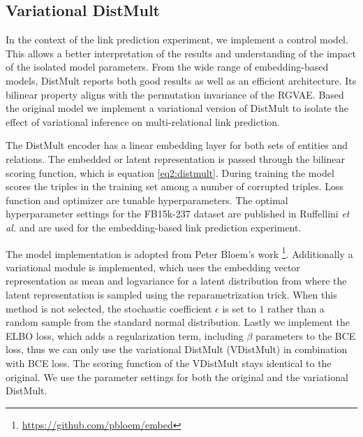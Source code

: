 \subsection{Variational DistMult}
\label{ssec4:vdistm}

In the context of the link prediction experiment, we implement a control model. This allows a better  interpretation of the results and understanding of the impact of the isolated model parameters. From the wide range of embedding-based models, DistMult reports both good results as well as an efficient architecture. Its bilinear property aligns with the permutation invariance of the RGVAE. Based the original model we implement a variational version of DistMult to isolate the effect of variational inference on multi-relational link prediction.

The DistMult encoder has a linear embedding layer for both sets of entities and relations. The embedded or latent representation is passed through the bilinear scoring function, which is equation \ref{eq2:distmult}. During training the model scores the triples in the training set among a number of corrupted triples. Loss function and optimizer are tunable hyperparameters. The optimal hyperparameter settings for the FB15k-237 dataset are published in Ruffellini \textit{et al.} \cite{ruffinelli_you_2019} and are used for the embedding-based link prediction experiment.

The model implementation is adopted from Peter Bloem's work \footnote{\url{https://github.com/pbloem/embed}}. Additionally a variational module is implemented, which uses the embedding vector representation as mean and logvariance for a latent distribution from where the latent representation is sampled using the reparametrization trick. When this method is not selected, the stochastic coefficient $\epsilon$ is set to $1$ rather than a random sample from the standard normal distribution. Lastly we implement the ELBO loss, which adds a regularization term, including $\beta$ parameters to the BCE loss, thus we can only use the variational DistMult (VDistMult) in combination with BCE loss. The scoring function of the VDistMult stays identical to the original. We use the parameter settings for both the original and the variational DistMult. 



